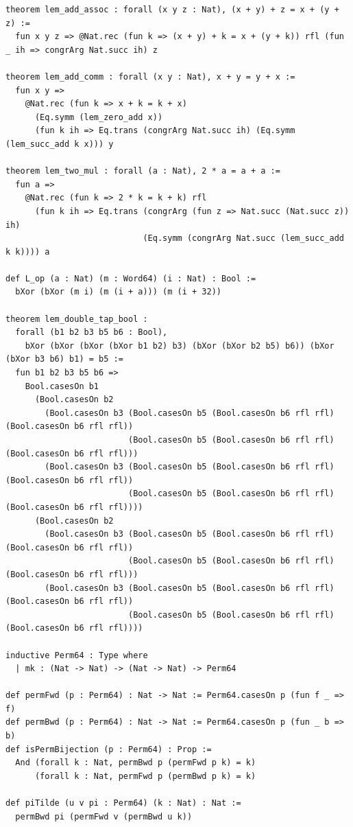 \documentclass[10pt,twocolumn]{article}
\theoremstyle{spectralthm}
\begin{document}
\begin{lstlisting}[language=Lean4,caption={Standalone Pure Init.Prelude Term-Mode Lean 4 Expansion (thm30--thm37, v1.1.0, 0 sorry, 0 axioms).},label={lst:lean_v110}]
theorem lem_add_assoc : forall (x y z : Nat), (x + y) + z = x + (y + z) :=
  fun x y z => @Nat.rec (fun k => (x + y) + k = x + (y + k)) rfl (fun _ ih => congrArg Nat.succ ih) z

theorem lem_add_comm : forall (x y : Nat), x + y = y + x :=
  fun x y =>
    @Nat.rec (fun k => x + k = k + x)
      (Eq.symm (lem_zero_add x))
      (fun k ih => Eq.trans (congrArg Nat.succ ih) (Eq.symm (lem_succ_add k x))) y

theorem lem_two_mul : forall (a : Nat), 2 * a = a + a :=
  fun a =>
    @Nat.rec (fun k => 2 * k = k + k) rfl
      (fun k ih => Eq.trans (congrArg (fun z => Nat.succ (Nat.succ z)) ih)
                            (Eq.symm (congrArg Nat.succ (lem_succ_add k k)))) a

def L_op (a : Nat) (m : Word64) (i : Nat) : Bool :=
  bXor (bXor (m i) (m (i + a))) (m (i + 32))

theorem lem_double_tap_bool :
  forall (b1 b2 b3 b5 b6 : Bool),
    bXor (bXor (bXor (bXor b1 b2) b3) (bXor (bXor b2 b5) b6)) (bXor (bXor b3 b6) b1) = b5 :=
  fun b1 b2 b3 b5 b6 =>
    Bool.casesOn b1
      (Bool.casesOn b2
        (Bool.casesOn b3 (Bool.casesOn b5 (Bool.casesOn b6 rfl rfl) (Bool.casesOn b6 rfl rfl))
                         (Bool.casesOn b5 (Bool.casesOn b6 rfl rfl) (Bool.casesOn b6 rfl rfl)))
        (Bool.casesOn b3 (Bool.casesOn b5 (Bool.casesOn b6 rfl rfl) (Bool.casesOn b6 rfl rfl))
                         (Bool.casesOn b5 (Bool.casesOn b6 rfl rfl) (Bool.casesOn b6 rfl rfl))))
      (Bool.casesOn b2
        (Bool.casesOn b3 (Bool.casesOn b5 (Bool.casesOn b6 rfl rfl) (Bool.casesOn b6 rfl rfl))
                         (Bool.casesOn b5 (Bool.casesOn b6 rfl rfl) (Bool.casesOn b6 rfl rfl)))
        (Bool.casesOn b3 (Bool.casesOn b5 (Bool.casesOn b6 rfl rfl) (Bool.casesOn b6 rfl rfl))
                         (Bool.casesOn b5 (Bool.casesOn b6 rfl rfl) (Bool.casesOn b6 rfl rfl))))

inductive Perm64 : Type where
  | mk : (Nat -> Nat) -> (Nat -> Nat) -> Perm64

def permFwd (p : Perm64) : Nat -> Nat := Perm64.casesOn p (fun f _ => f)
def permBwd (p : Perm64) : Nat -> Nat := Perm64.casesOn p (fun _ b => b)
def isPermBijection (p : Perm64) : Prop :=
  And (forall k : Nat, permBwd p (permFwd p k) = k)
      (forall k : Nat, permFwd p (permBwd p k) = k)

def piTilde (u v pi : Perm64) (k : Nat) : Nat :=
  permBwd pi (permFwd v (permBwd u k))


\end{lstlisting}
\end{document}
